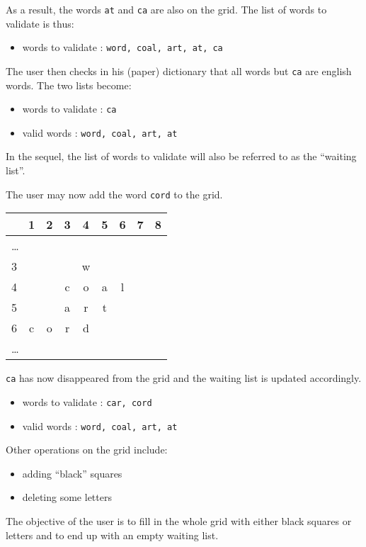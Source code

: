 \documentclass{article}
\begin{document}
\vspace{0.5cm}

As a result, the words {\tt at} and {\tt ca} are also on the grid. The list of
words to validate is thus:

\begin{itemize}
\item[ ] words to validate : {\tt word, coal, art, at, ca}
\end{itemize}

The user then checks in his (paper) dictionary that all words but {\tt ca} are
english words. The two lists become:

\begin{itemize}
\item[ ] words to validate : {\tt ca}
\item[ ] valid words : {\tt word, coal, art, at}
\end{itemize}

In the sequel, the list of words to validate will also be referred to as the
``waiting list''.

\newpage
The user may now add the word {\tt cord} to the grid.

\vspace{0.5cm}

{\tt \begin{tabular}{r|c|c|c|c|c|c|c|c|}
 & 1 & 2 & 3 & 4 & 5 & 6 & 7 & 8\\
\hline
\multicolumn{9}{l}{\ldots}\\
\hline
3 & & & &w& & & & \\
\hline
4 & & &c &o &a &l & & \\
\hline
5 & & &a &r&t & & & \\
\hline
6 &c &o &r &d& & & & \\
\hline
\multicolumn{9}{l}{\ldots}\\
\end{tabular}}

\vspace{0.5cm}

{\tt ca} has now disappeared from the grid and the waiting list
is updated accordingly.

\begin{itemize}
\item[ ] words to validate : {\tt car, cord}
\item[ ] valid words : {\tt word, coal, art, at}
\end{itemize}

Other operations on the grid include:

\begin{itemize}
\item adding ``black'' squares
\item deleting some letters
\end{itemize}

The objective of the user is to fill in the whole grid with either black
squares or letters and to end up with an empty waiting list. 


\end{document}
